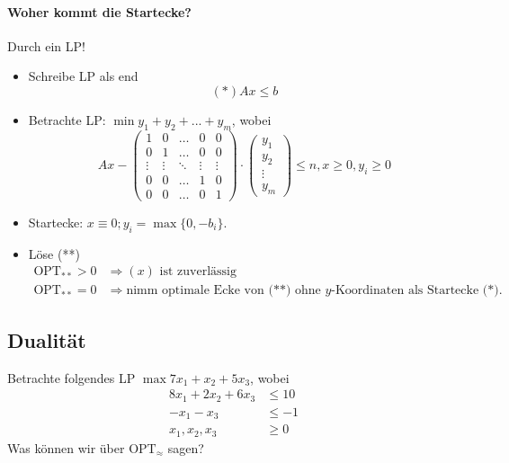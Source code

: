 \paragraph*{Woher kommt die Startecke?}
Durch ein LP!
\begin{itemize}
 \item Schreibe LP als
end{} \[(*) Ax \leq b \tag{ersetze $x_i$ durch $x_i^+ - x_i^-, x_i^+, x_i^- \geq 0$}\]
 \item Betrachte LP: $\min y_1 + y_2 + ... + y_m$, wobei
 \[Ax - \begin{pmatrix} 1 & 0 & \hdots & 0 & 0 \\ 0 & 1 & \hdots & 0 & 0 \\ \vdots & \vdots & \ddots & \vdots & \vdots \\ 0 & 0 & \hdots & 1 & 0 \\ 0 & 0 & \hdots & 0 & 1 \end{pmatrix} \cdot \begin{pmatrix}y_1 \\ y_2 \\ \vdots \\ y_m\end{pmatrix} \leq n, x \geq 0, y_i \geq 0 \tag{**}\]
 \item Startecke: $x \equiv 0; y_i = \max\{0, -b_i\}$.
 \item Löse (**)
     \begin{align*}
      \text{OPT}_{**} > 0 & \Rightarrow \text{$(x)$ ist zuverlässig} \\
      \text{OPT}_{**} = 0 & \Rightarrow \text{nimm optimale Ecke von (**) ohne $y$-Koordinaten als Startecke (*).}
     \end{align*}
\end{itemize}

\subsection{Dualität}
Betrachte folgendes LP $\max 7x_1 + x_2 + 5x_3$, wobei
\begin{align*}
 8x_1 + 2x_2 + 6x_3 &\leq 10 \tag{1} \\
 -x_1 - x_3 &\leq -1 \tag{2} \\
 x_1, x_2, x_3 &\geq 0
\end{align*}
Was können wir über $\text{OPT}_\approx$ sagen?
